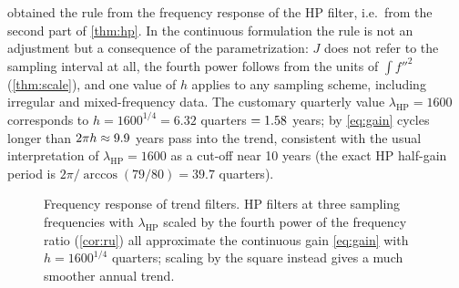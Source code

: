 \documentclass[11pt,a4paper]{article}
\theoremstyle{definition}
\theoremstyle{remark}
\begin{document}
\citet{RavnUhlig2002} obtained the rule from the frequency response of the HP filter, i.e.\ from the second part of \cref{thm:hp}. In the continuous formulation the rule is not an adjustment but a consequence of the parametrization: $J$ does not refer to the sampling interval at all, the fourth power follows from the units of $\int f''^2$ (\cref{thm:scale}), and one value of $h$ applies to any sampling scheme, including irregular and mixed-frequency data. The customary quarterly value $\lambda_{\mathrm{HP}}=1600$ corresponds to $h=1600^{1/4}=6.32$ quarters $=1.58$ years; by \eqref{eq:gain} cycles longer than $2\pi h\approx9.9$ years pass into the trend, consistent with the usual interpretation of $\lambda_{\mathrm{HP}}=1600$ as a cut-off near 10 years (the exact HP half-gain period is $2\pi/\arccos(79/80)=39.7$ quarters).

\begin{figure}[t]
\centering
{}
\caption{Frequency response of trend filters. HP filters at three sampling frequencies with $\lambda_{\mathrm{HP}}$ scaled by the fourth power of the frequency ratio (\cref{cor:ru}) all approximate the continuous gain \eqref{eq:gain} with $h=1600^{1/4}$ quarters; scaling by the square instead gives a much smoother annual trend.}
\label{fig:gain}
\end{figure}
\end{document}
